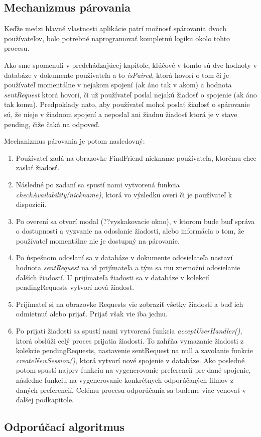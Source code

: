 \subsection{Mechanizmus párovania}
Keďže medzi hlavné vlastnosti aplikácie patrí možnosť spárovania dvoch používateľov, bolo potrebné naprogramovať kompletnú logiku okolo tohto procesu. 

Ako sme spomenuli v predchádzajúcej kapitole, kľúčové v tomto sú dve hodnoty v databáze v dokumente používateľa a to \textit{isPaired}, ktorá hovorí o tom či je používateľ momentálne v nejakom spojení (ak áno tak v akom) a hodnota \textit{sentRequest} ktorá hovorí, či už používateľ poslal nejakú žiadosť o spojenie (ak áno tak komu). Predpoklady nato, aby používateľ mohol poslať žiadosť o spárovanie sú, že nieje v žiadnom spojení a neposlal ani žiadnu žiadosť ktorá je v stave pending, čiže čaká na odpoveď.

Mechanizmus párovania je potom nasledovný:
\begin{enumerate}
    \item {Používateľ zadá na obrazovke FindFriend nickname používateľa, ktorému chce zaslať žiadosť.}
    \item {Následné po zadaní sa spustí nami vytvorená funkcia \textit{checkAvailability(nickname)}, ktorá vo výsledku overí či je používateľ k dispozícií.}
    \item {Po overení sa otvorí modal (??vyskakovacie okno), v ktorom bude buď správa o dostupnosti a vyzvanie na odoslanie žiadosti, alebo informácia o tom, že používateľ momentálne nie je dostupný na párovanie.}
    \item {Po úspešnom odoslaní sa v databáze v dokumente odosielateľa nastaví hodnota \textit{sentRequest} na id prijímateľa a tým sa mu znemožní odosielanie ďalších žiadostí. U prijímateľa žiadosti sa v databáze v kolekcií pendingRequests vytvorí nová žiadosť.}
    \item {Prijímateľ si na obrazovke Requests vie zobraziť všetky žiadosti a buď ich odmietnuť alebo prijať. Prijať však vie iba jednu.}
    \item {Po prijatí žiadosti sa spustí nami vytvorená funkcia \textit{acceptUserHandler()}, ktorá obslúži celý proces prijatia žiadosti. To zahŕňa vymazanie žiadosti z kolekcie pendingRequests, nastavenie sentRequest na null a zavolanie funkcie \textit{createNewSession()}, ktorá vytvorí nové spojenie v databáze. Ako posledné potom spustí najprv funkciu na vygenerovanie preferencií pre dané spojenie, následne funkciu na vygenerovanie konkrétnych odporúčaných filmov z daných preferencií. Celému procesu odporúčania sa budeme viac venovať v ďalšej podkapitole.}
\end{enumerate}

\subsection{Odporúčací algoritmus}










